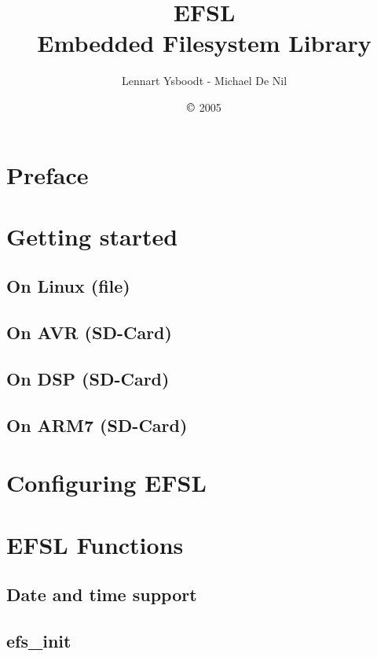 \documentclass[a4paper,fleqn]{article}
\begin{document}
\title{\Huge{EFSL}\\\Large{Embedded Filesystem Library}}
\author{Lennart Ysboodt - Michael De Nil}
\date{$\copyright$ 2005}
\maketitle

\newpage
\tableofcontents

\setlength{\parindent}{0pt}
\setlength{\parskip}{1ex plus 0.5ex minus 0.2ex}

\newpage
\section{Preface}


\newpage
\section{Getting started}
\subsection{On Linux (file)}
	
\newpage
\subsection{On AVR (SD-Card)}
	
\newpage
\subsection{On DSP (SD-Card)}
	
\newpage
\subsection{On ARM7 (SD-Card)}
	
\newpage
\section{Configuring EFSL}
	

\newpage
\section{EFSL Functions}
\subsection{Date and time support}
	
	\newpage
\subsection{efs\_init}
	
	\newpage
\end{document}
